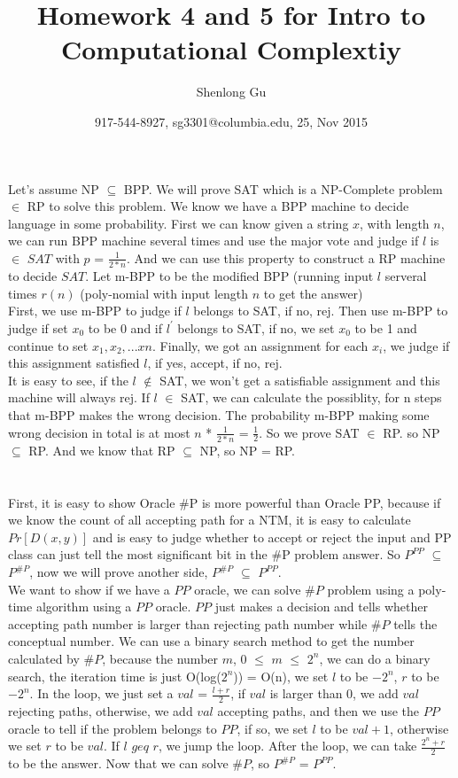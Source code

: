 \documentclass[11pt]{article}
\title{Homework 4 and 5 for Intro to Computational Complextiy}
\author{Shenlong Gu}
\date{917-544-8927, sg3301@columbia.edu, 25, Nov 2015}
\begin{document}
\maketitle
\part{}
Let's assume NP $\subseteq$ BPP. We will prove SAT which is a NP-Complete problem $\in$ RP to solve this problem. We know we have a BPP machine to decide language in some probability. First we can know given a string $x$, with length $n$, we can run BPP machine several times and use the major vote and judge if $l$ is $\in$ $SAT$ with $p$ = $\frac{1}{2 * n}$. And we can use this property to construct a RP machine to decide $SAT$. Let m-BPP to be the modified BPP (running input $l$ serveral times $r(n)$ (poly-nomial with input length $n$ to get the answer) \\
First, we use m-BPP to judge if $l$ belongs to SAT, if no, rej. Then use m-BPP to judge if set $x_{0}$ to be 0 and if $l^{'}$ belongs to SAT, if no, we set $x_{0}$ to be 1 and continue to set $x_{1}, x_{2}, ...x{n}$. Finally, we got an assignment for each $x_{i}$, we judge if this assignment satisfied $l$, if yes, accept, if no, rej. \\ 
It is easy to see, if the $l$ $\notin$ SAT, we won't get a satisfiable assignment and this machine will always rej. If $l$ $\in$ SAT, we can calculate the possiblity, for n steps that m-BPP makes the wrong decision. The probability m-BPP making some wrong decision in total is at most $n$ * $\frac{1}{2 * n}$ = $\frac{1}{2}$. So we prove SAT $\in$ RP. so NP $\subseteq$ RP. And we know that RP $\subseteq$ NP, so NP = RP.
\part{}
First, it is easy to show Oracle \#P is more powerful than Oracle PP, because if we know the count of all accepting path for a NTM, it is easy to calculate $Pr[D(x,y)]$ and is easy to judge whether to accept or reject the input and PP class can just tell the most significant bit in the \#P problem answer. So $P^{PP}$ $\subseteq$ $P^{\#P}$, now we will prove another side, $P^{\#P}$ $\subseteq$ $P^{PP}$.  \\
We want to show if we have a $PP$ oracle, we can solve $\#P$ problem using a poly-time algorithm using a $PP$ oracle. $PP$ just makes a decision and tells whether accepting path number is larger than rejecting path number while $\#P$ tells the conceptual number. We can use a binary search method to get the number calculated by $\#P$, because the number $m$, 0 $\leq$ $m$ $\leq$ $2^{n}$, we can do a binary search, the iteration time is just O(log($2^{n}$)) = O(n), we set $l$ to be $-2^{n}$, $r$ to be $-2^{n}$. In the loop, we just set a $val$ = $\frac{l+r}{2}$, if $val$ is larger than 0, we add $val$ rejecting paths, otherwise, we add $val$ accepting paths, and then we use the $PP$ oracle to tell if the problem belongs to $PP$, if so, we set $l$ to be $val + 1$, otherwise we set $r$ to be $val$. If $l$ $geq$ $r$, we jump the loop. After the loop, we can take $\frac{2^{n} + r}{2}$ to be the answer. Now that we can solve $\#P$, so $P^{\#P}$ = $P^{PP}$.
\end{document}
